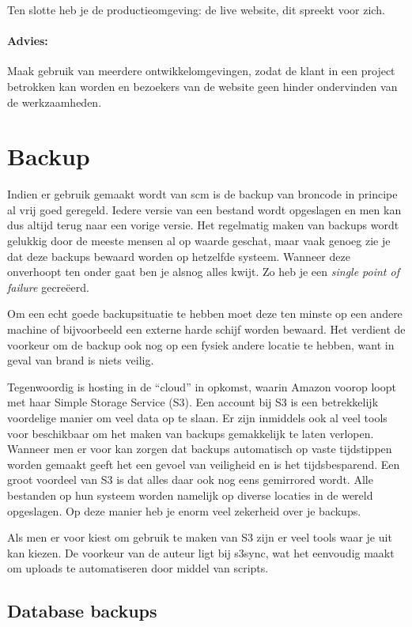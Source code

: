 Ten slotte heb je de productieomgeving: de live website, dit spreekt voor zich.

\paragraph{Advies:} Maak gebruik van meerdere ontwikkelomgevingen, zodat de klant in een project betrokken kan worden en bezoekers van de website geen hinder ondervinden van de werkzaamheden.

\section{Backup}

Indien er gebruik gemaakt wordt van {\sc scm} is de backup van broncode in principe al vrij goed geregeld. Iedere versie van een bestand wordt opgeslagen en men kan dus altijd terug naar een vorige versie. Het regelmatig maken van backups wordt gelukkig door de meeste mensen al op waarde geschat, maar vaak genoeg zie je dat deze backups bewaard worden op hetzelfde systeem. Wanneer deze onverhoopt ten onder gaat ben je alsnog alles kwijt. Zo heb je een  \emph{single point of failure} gecreëerd.

Om een echt goede backupsituatie te hebben moet deze ten minste op een andere machine of bijvoorbeeld een externe harde schijf worden bewaard. Het verdient de voorkeur om de backup ook nog op een fysiek andere locatie te hebben, want in geval van brand is niets veilig.

Tegenwoordig is hosting in de ``cloud'' in opkomst, waarin Amazon voorop loopt met haar Simple Storage Service (S3). Een account bij S3 is een betrekkelijk voordelige manier om veel data op te slaan. Er zijn inmiddels ook al veel tools voor beschikbaar om het maken van backups gemakkelijk te laten verlopen. Wanneer men er voor kan zorgen dat backups automatisch op vaste tijdstippen worden gemaakt geeft het een gevoel van veiligheid en is het tijdsbesparend. Een groot voordeel van S3 is dat alles daar ook nog eens gemirrored wordt. Alle bestanden op hun systeem worden namelijk op diverse locaties in de wereld opgeslagen. Op deze manier heb je enorm veel zekerheid over je backups.

Als men er voor kiest om gebruik te maken van S3 zijn er veel tools waar je uit kan kiezen.\cite{amazontools} De voorkeur van de auteur ligt bij s3sync\cite{s3sync}, wat het eenvoudig maakt om uploads te automatiseren door middel van scripts.

\subsection{Database backups}

